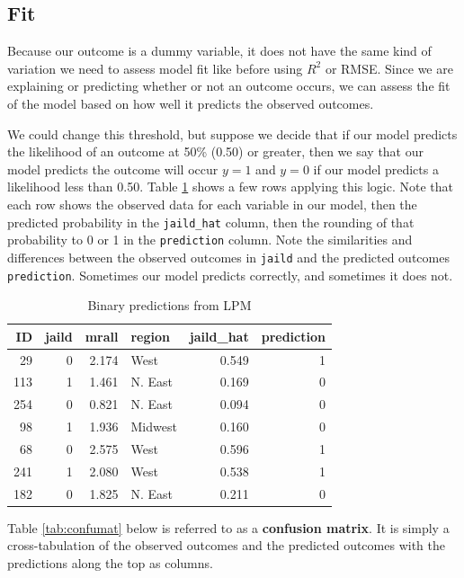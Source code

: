 \documentclass[
]{book}
\begin{document}
\hypertarget{fit}{%
\subsection{Fit}\label{fit}}

Because our outcome is a dummy variable, it does not have the same kind of variation we need to assess model fit like before using \(R^2\) or RMSE. Since we are explaining or predicting whether or not an outcome occurs, we can assess the fit of the model based on how well it predicts the observed outcomes.

We could change this threshold, but suppose we decide that if our model predicts the likelihood of an outcome at 50\% (0.50) or greater, then we say that our model predicts the outcome will occur \(y=1\) and \(y=0\) if our model predicts a likelihood less than 0.50. Table \ref{tab:lpmpointstab} shows a few rows applying this logic. Note that each row shows the observed data for each variable in our model, then the predicted probability in the \texttt{jaild\_hat} column, then the rounding of that probability to 0 or 1 in the \texttt{prediction} column. Note the similarities and differences between the observed outcomes in \texttt{jaild} and the predicted outcomes \texttt{prediction}. Sometimes our model predicts correctly, and sometimes it does not.

\begin{table}

\caption{\label{tab:lpmpointstab}Binary predictions from LPM}
\centering
\begin{tabular}[t]{r|r|r|l|r|r}
\hline
ID & jaild & mrall & region & jaild\_hat & prediction\\
\hline
29 & 0 & 2.174 & West & 0.549 & 1\\
\hline
113 & 1 & 1.461 & N. East & 0.169 & 0\\
\hline
254 & 0 & 0.821 & N. East & 0.094 & 0\\
\hline
98 & 1 & 1.936 & Midwest & 0.160 & 0\\
\hline
68 & 0 & 2.575 & West & 0.596 & 1\\
\hline
241 & 1 & 2.080 & West & 0.538 & 1\\
\hline
182 & 0 & 1.825 & N. East & 0.211 & 0\\
\hline
\end{tabular}
\end{table}

Table \ref{tab:confumat} below is referred to as a \textbf{confusion matrix}. It is simply a cross-tabulation of the observed outcomes and the predicted outcomes with the predictions along the top as columns.
\end{document}
